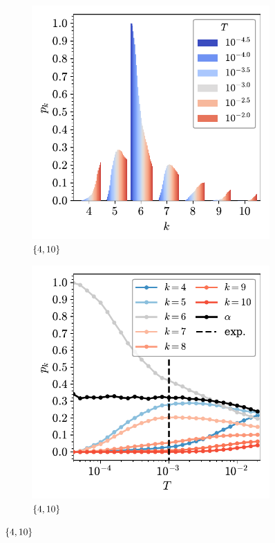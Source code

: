 \begin{figure}[bt]
	\vspace{2mm}          
     \begin{subfigure}[b]{0.45\textwidth}
         \centering
         \includegraphics[width=\textwidth]{./figures/bilayers/triraft_410.pdf}
         \caption{$\left\{4,10\right\}$}
         \label{fig:trpk3}
     \end{subfigure}
     \hfill
	\begin{subfigure}[b]{0.45\textwidth}
         \centering
         \includegraphics[width=\textwidth]{./figures/bilayers/triraft_line_410.pdf}
         \caption{$\left\{4,10\right\}$}
         \label{fig:trpk4}
     \end{subfigure}
     \hfill
   

\end{figure}
